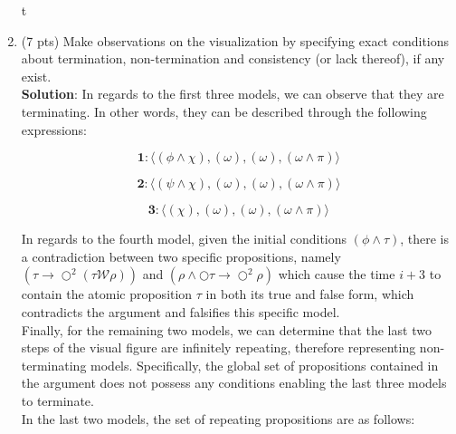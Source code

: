 \documentclass[12pt]{article}
\begin{document}
\begin{spacing}{1.5}
\begin{enumerate}
\begin{center}
t

		      \end{center}

		\item (7 pts) Make observations on the visualization by specifying exact conditions about termination, non-termination and consistency (or lack thereof), if any exist.\\
		      		      		      		      		      		      
		      \textbf{Solution}: In regards to the first three models, we can observe that they are terminating. In other words, they can be described through the following expressions:
		      		      		      		      		      		      
		      $$\textbf{1}: \langle (\phi \land \chi), (\omega), (\omega), (\omega \land \pi) \rangle$$
		      		      		      		      		      		      
		      $$\textbf{2}: \langle (\psi \land \chi), (\omega),(\omega),(\omega \land \pi) \rangle$$
		      		      		      		      		      		      
		      $$\textbf{3}: \langle (\chi), (\omega),(\omega),(\omega \land \pi) \rangle $$
		      		      		      		      		      		      
		      In regards to the fourth model, given the initial conditions $(\phi \land \tau)$, there is a contradiction between two specific propositions, namely $(\tau \rightarrow \bigcirc^2(\tau \mathcal{W} \rho))$ and $(\rho \land \bigcirc \tau \rightarrow \bigcirc^2 \rho)$ which cause the time $i+3$ to contain the atomic proposition $\tau$ in both its true and false form, which contradicts the argument and falsifies this specific model.\\
		      		      		      		      		      		                      
		      Finally, for the remaining two models, we can determine that the last two steps of the visual figure are infinitely repeating, therefore representing non-terminating models. Specifically, the global set of propositions contained in the argument does not possess any conditions enabling the last three models to terminate.\\
		      		      		      		      		      		      
		      In the last two models, the set of repeating propositions are as follows:
		      		      		      		      		      		      

\end{enumerate}
\end{spacing}
\end{document}
